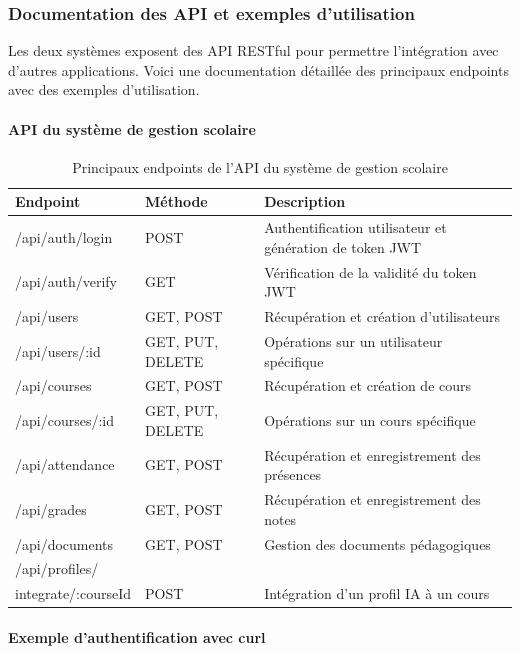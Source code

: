 \subsubsection{Documentation des API et exemples d'utilisation}

Les deux systèmes exposent des API RESTful pour permettre l'intégration avec d'autres applications. Voici une documentation détaillée des principaux endpoints avec des exemples d'utilisation.

\paragraph{API du système de gestion scolaire}

\begin{table}[H]
\centering
\begin{tabular}{|p{3.5cm}|p{2cm}|p{8.5cm}|}
\hline
\textbf{Endpoint} & \textbf{Méthode} & \textbf{Description} \\
\hline
/api/auth/login & POST & Authentification utilisateur et génération de token JWT \\
\hline
/api/auth/verify & GET & Vérification de la validité du token JWT \\
\hline
/api/users & GET, POST & Récupération et création d'utilisateurs \\
\hline
/api/users/:id & GET, PUT, DELETE & Opérations sur un utilisateur spécifique \\
\hline
/api/courses & GET, POST & Récupération et création de cours \\
\hline
/api/courses/:id & GET, PUT, DELETE & Opérations sur un cours spécifique \\
\hline
/api/attendance & GET, POST & Récupération et enregistrement des présences \\
\hline
/api/grades & GET, POST & Récupération et enregistrement des notes \\
\hline
/api/documents & GET, POST & Gestion des documents pédagogiques \\
\hline
/api/profiles/\\integrate/:courseId & POST & Intégration d'un profil IA à un cours \\
\hline
\end{tabular}
\caption{Principaux endpoints de l'API du système de gestion scolaire}
\label{tab:school_api_endpoints}
\end{table}

\paragraph{Exemple d'authentification avec curl}

